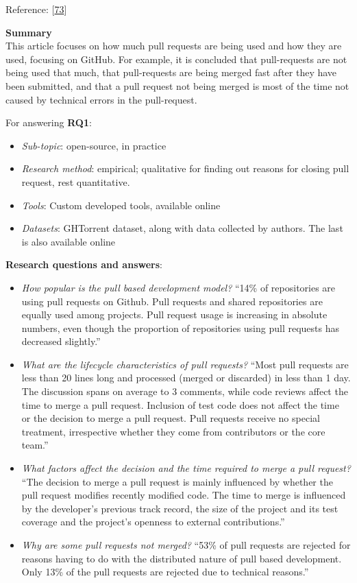 \documentclass[]{book}
\providecommand{\tightlist}{%
  \setlength{\itemsep}{0pt}\setlength{\parskip}{0pt}}
\begin{document}
Reference: {[}\protect\hyperlink{ref-gousios2014exploratory}{73}{]}

\textbf{Summary}\\
This article focuses on how much pull requests are being used and how
they are used, focusing on GitHub. For example, it is concluded that
pull-requests are not being used that much, that pull-requests are being
merged fast after they have been submitted, and that a pull request not
being merged is most of the time not caused by technical errors in the
pull-request.

For answering \textbf{RQ1}:

\begin{itemize}
\tightlist
\item
  \emph{Sub-topic}: open-source, in practice
\item
  \emph{Research method}: empirical; qualitative for finding out reasons
  for closing pull request, rest quantitative.
\item
  \emph{Tools}: Custom developed tools, available online
\item
  \emph{Datasets}: GHTorrent dataset, along with data collected by
  authors. The last is also available online
\end{itemize}

\textbf{Research questions and answers}:

\begin{itemize}
\tightlist
\item
  \emph{How popular is the pull based development model?} ``14\% of
  repositories are using pull requests on Github. Pull requests and
  shared repositories are equally used among projects. Pull request
  usage is increasing in absolute numbers, even though the proportion of
  repositories using pull requests has decreased slightly.''
\item
  \emph{What are the lifecycle characteristics of pull requests?} ``Most
  pull requests are less than 20 lines long and processed (merged or
  discarded) in less than 1 day. The discussion spans on average to 3
  comments, while code reviews affect the time to merge a pull request.
  Inclusion of test code does not affect the time or the decision to
  merge a pull request. Pull requests receive no special treatment,
  irrespective whether they come from contributors or the core team.''
\item
  \emph{What factors affect the decision and the time required to merge
  a pull request?} ``The decision to merge a pull request is mainly
  influenced by whether the pull request modifies recently modified
  code. The time to merge is influenced by the developer's previous
  track record, the size of the project and its test coverage and the
  project's openness to external contributions.''
\item
  \emph{Why are some pull requests not merged?} ``53\% of pull requests
  are rejected for reasons having to do with the distributed nature of
  pull based development. Only 13\% of the pull requests are rejected
  due to technical reasons.''
\end{itemize}
\end{document}
